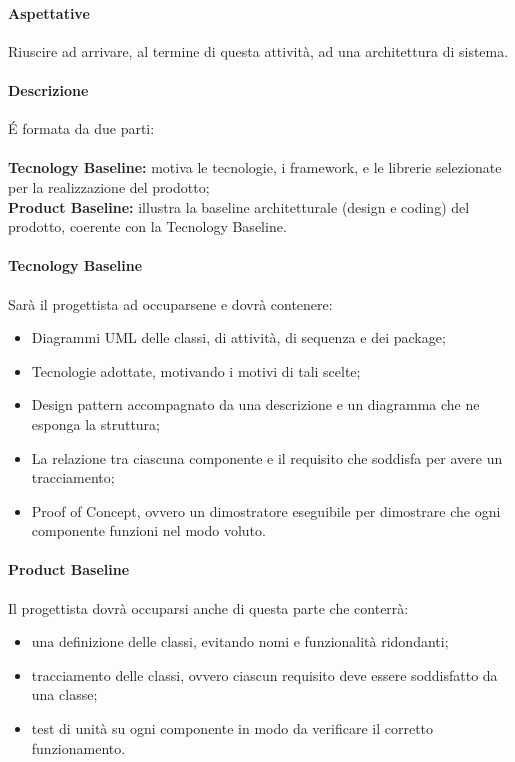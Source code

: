 \paragraph{Aspettative}
Riuscire ad arrivare, al termine di questa attività, ad una architettura di sistema.
\paragraph{Descrizione}
\'E formata da due parti:\\ \\
\textbf{Tecnology Baseline:} motiva le tecnologie, i framework, e le librerie selezionate per la realizzazione del prodotto;\\
\textbf{Product Baseline:} illustra la baseline architetturale (design e coding) del prodotto, coerente con la Tecnology Baseline.
\paragraph{Tecnology Baseline}
Sarà il progettista ad occuparsene e dovrà contenere:
\begin{itemize}
\item Diagrammi UML delle classi, di attività, di sequenza e dei package;
\item Tecnologie adottate, motivando i motivi di tali scelte;
\item Design pattern accompagnato da una descrizione e un diagramma che ne esponga la struttura;
\item La relazione tra ciascuna componente e il requisito che soddisfa per avere un tracciamento;  
\item Proof of Concept, ovvero un dimostratore eseguibile per dimostrare che ogni componente funzioni nel modo voluto.
\end{itemize}
\paragraph{Product Baseline}
Il progettista dovrà occuparsi anche di questa parte che conterrà:
\begin{itemize}
\item una definizione delle classi, evitando nomi e funzionalità ridondanti;
\item tracciamento delle classi, ovvero ciascun requisito deve essere soddisfatto da una classe;
\item test di unità su ogni componente in modo da verificare il corretto funzionamento.
\end{itemize}
